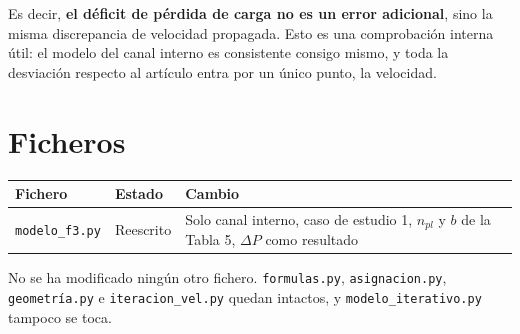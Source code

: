 \documentclass[11pt,a4paper]{article}
\begin{document}
Es decir, \textbf{el déficit de pérdida de carga no es un error adicional}, sino la misma
discrepancia de velocidad propagada. Esto es una comprobación interna útil: el modelo del canal
interno es consistente consigo mismo, y toda la desviación respecto al artículo entra por un
único punto, la velocidad.

\section{Ficheros}

\begin{table}[h]
\centering
\begin{tabular}{llp{7.8cm}}
\toprule
Fichero & Estado & Cambio\\
\midrule
\texttt{modelo\_f3.py} & Reescrito & Solo canal interno, caso de estudio 1, $n_{pl}$ y $b$ de la Tabla 5, $\Delta P$ como resultado\\
\bottomrule
\end{tabular}
\end{table}

No se ha modificado ningún otro fichero. \texttt{formulas.py},
\texttt{asignacion.py}, \texttt{geometría.py} e \texttt{iteracion\_vel.py} quedan intactos, y
\texttt{modelo\_iterativo.py} tampoco se toca.
\end{document}
